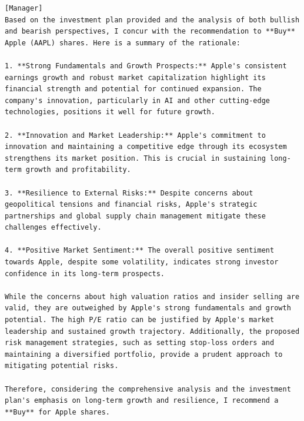 \begin{tcolorbox}[
    breakable,
    enhanced,
    colback=lightlilac!50!white,
    colframe=violet!20!gray,
    coltitle=black,
    boxrule=0.5pt,
    arc=0.5mm,
    top=2mm, bottom=2mm, left=2mm, right=2mm,
    fonttitle=\usefont{T1}{ppl}{b}{n},
    title=\model: Fund Manager -- Apple (AAPL),
]
\footnotesize
\begin{lstlisting}[style=agentbase]
[Manager]
Based on the investment plan provided and the analysis of both bullish and bearish perspectives, I concur with the recommendation to **Buy** Apple (AAPL) shares. Here is a summary of the rationale:

1. **Strong Fundamentals and Growth Prospects:** Apple's consistent earnings growth and robust market capitalization highlight its financial strength and potential for continued expansion. The company's innovation, particularly in AI and other cutting-edge technologies, positions it well for future growth.

2. **Innovation and Market Leadership:** Apple's commitment to innovation and maintaining a competitive edge through its ecosystem strengthens its market position. This is crucial in sustaining long-term growth and profitability.

3. **Resilience to External Risks:** Despite concerns about geopolitical tensions and financial risks, Apple's strategic partnerships and global supply chain management mitigate these challenges effectively.

4. **Positive Market Sentiment:** The overall positive sentiment towards Apple, despite some volatility, indicates strong investor confidence in its long-term prospects.

While the concerns about high valuation ratios and insider selling are valid, they are outweighed by Apple's strong fundamentals and growth potential. The high P/E ratio can be justified by Apple's market leadership and sustained growth trajectory. Additionally, the proposed risk management strategies, such as setting stop-loss orders and maintaining a diversified portfolio, provide a prudent approach to mitigating potential risks.

Therefore, considering the comprehensive analysis and the investment plan's emphasis on long-term growth and resilience, I recommend a **Buy** for Apple shares.

\end{lstlisting}
\end{tcolorbox}
